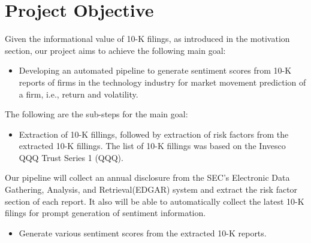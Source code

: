 \documentclass[logo,bsc,singlespacing,parskip]{infthesis}
\begin{document}
\section{Project Objective}
Given the informational value of 10-K filings, as introduced in the motivation section, our project aims to achieve the following main goal:

\begin{itemize}
    \item Developing an automated pipeline to generate sentiment scores from 10-K reports of firms in the technology industry for market movement prediction of a firm, i.e., return and volatility.
\end{itemize}

The following are the sub-steps for the main goal:

\begin{itemize}
    \item Extraction of 10-K fillings, followed by extraction of risk factors from the extracted 10-K fillings. The list of 10-K fillings was based on the Invesco QQQ Trust Series 1 (QQQ).
\end{itemize}

Our pipeline will collect an annual disclosure from the SEC’s Electronic Data Gathering, Analysis, and Retrieval(EDGAR) system and extract the risk factor section of each report. It also will be able to automatically collect the latest 10-K filings for prompt generation of sentiment information. 


\begin{itemize}
    \item Generate various sentiment scores from the extracted 10-K reports.
\end{itemize}
\end{document}
